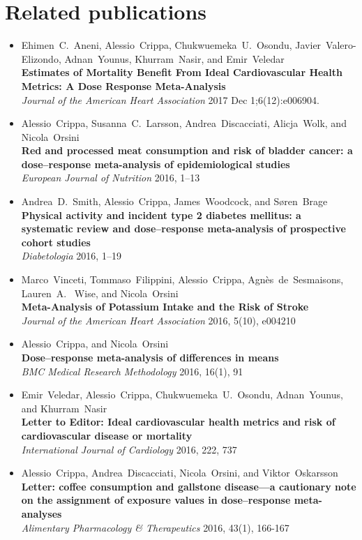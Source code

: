 \documentclass[11pt,a4paper,twoside,openany]{book}\usepackage{knitr}
\begin{document}
{\chapter*{Related publications}
\begin{itemize}
\item Ehimen~C.~Aneni, Alessio~Crippa, Chukwuemeka~U.~Osondu, Javier~Valero-Elizondo, Adnan~Younus, Khurram~Nasir, and Emir~Veledar \\ \textbf{Estimates of Mortality Benefit From Ideal Cardiovascular Health Metrics: A Dose Response Meta-Analysis} \\ \textit{Journal of the American Heart Association} 2017 Dec 1;6(12):e006904.
\item Alessio~Crippa, Susanna~C.~Larsson, Andrea~Discacciati, Alicja~Wolk, and Nicola~Orsini \\ \textbf{Red and processed meat consumption and risk of bladder cancer: a dose--response meta-analysis of epidemiological studies} \\ \textit{European Journal of Nutrition} 2016, 1--13
\item Andrea~D.~Smith, Alessio~Crippa, James~Woodcock, and S{\o}ren~Brage \\ \textbf{Physical activity and incident type 2 diabetes mellitus: a systematic review and dose--response meta-analysis of prospective cohort studies} \\ \textit{Diabetologia} 2016, 1--19
\item Marco~Vinceti, Tommaso~Filippini, Alessio~Crippa, Agn{\`e}s~de~Sesmaisons, Lauren~A.~ Wise, and Nicola~Orsini \\ \textbf{Meta-Analysis of Potassium Intake and the Risk of Stroke} \\ \textit{Journal of the American Heart Association} 2016, 5(10), e004210
\item Alessio~Crippa, and Nicola~Orsini \\ \textbf{Dose--response meta-analysis of differences in means} \\ \textit{BMC Medical Research Methodology} 2016, 16(1), 91
\item Emir~Veledar, Alessio~Crippa, Chukwuemeka~U.~Osondu, Adnan~Younus, and Khurram~Nasir \\ \textbf{Letter to Editor: Ideal cardiovascular health metrics and risk of cardiovascular disease or mortality} \\ \textit{International Journal of Cardiology} 2016, 222, 737
\item Alessio~Crippa, Andrea~Discacciati, Nicola~Orsini, and Viktor~Oskarsson \\ \textbf{Letter: coffee consumption and gallstone disease---a cautionary note on the assignment of exposure values in dose--response meta-analyses} \\ \textit{Alimentary Pharmacology \& Therapeutics} 2016, 43(1), 166-167

\end{itemize}}
\end{document}
